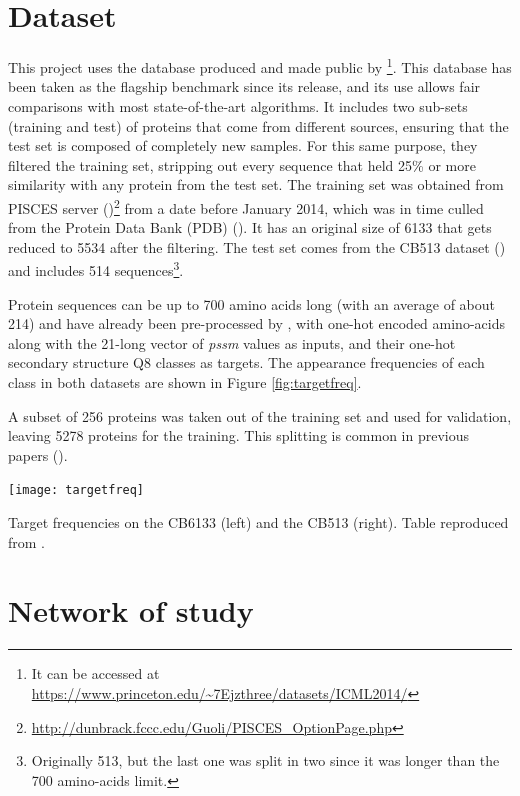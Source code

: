 \section{Dataset}
This project uses the database produced and made public by \cite{Zhou2014}\footnote{It can be accessed at \url{https://www.princeton.edu/\~7Ejzthree/datasets/ICML2014/}}. This database has been taken as the flagship benchmark since its release, and its use allows fair comparisons with most state-of-the-art algorithms. It includes two sub-sets (training and test) of proteins that come from different sources, ensuring that the test set is composed of completely new samples. For this same purpose, they filtered the training set, stripping out every sequence that held 25\% or more similarity with any protein from the test set.
The training set was obtained from PISCES server (\cite{Wang2003})\footnote{\url{http://dunbrack.fccc.edu/Guoli/PISCES\_OptionPage.php}} from a date before January 2014, which was in time culled from the Protein Data Bank (PDB) (\cite{Berman2003}).
It has an original size of 6133 that gets reduced to 5534 after the filtering. The test set comes from the CB513 dataset (\cite{Cuff1999}) and includes 514 sequences\footnote{Originally 513, but the last one was split in two since it was longer than the 700 amino-acids limit.}.

Protein sequences can be up to 700 amino acids long (with an average of about 214) and have already been pre-processed by \cite{Zhou2014}, with one-hot encoded amino-acids along with the 21-long vector of \textit{pssm} values as inputs, and their one-hot secondary structure Q8 classes as targets. The appearance frequencies of each class in both datasets are shown in Figure \ref{fig:targetfreq}.

A subset of 256 proteins was taken out of the training set and used for validation, leaving 5278 proteins for the training. This splitting is common in previous papers (\cite{Zhou2014,Sønderby2014,Busia2017,Jurtz2017,Hattori2017}).

\begin{table}
	\centering
	\texttt{[image: targetfreq]}
	\caption{Target frequencies on the CB6133 (left) and the CB513 (right). Table reproduced from \cite{Hattori2017}.}
	\label{fig:targetfreq}
\end{table}


\section{Network of study}\label{sect:network}

